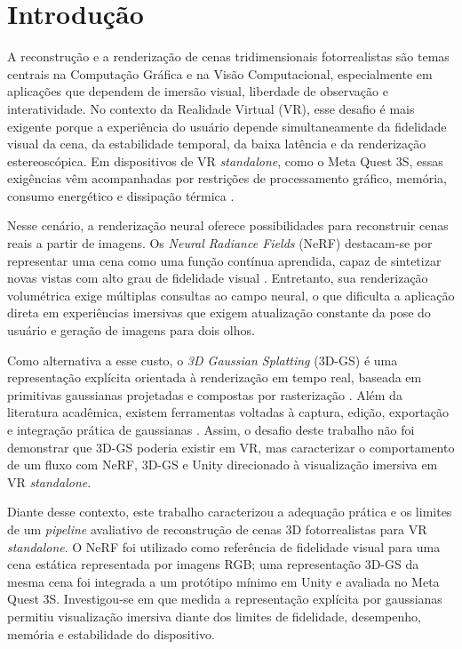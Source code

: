 \chapter{Introdução}

A reconstrução e a renderização de cenas tridimensionais fotorrealistas são temas centrais na Computação Gráfica e na Visão Computacional, especialmente em aplicações que dependem de imersão visual, liberdade de observação e interatividade. No contexto da Realidade Virtual (VR), esse desafio é mais exigente porque a experiência do usuário depende simultaneamente da fidelidade visual da cena, da estabilidade temporal, da baixa latência e da renderização estereoscópica. Em dispositivos de VR \textit{standalone}, como o Meta Quest 3S, essas exigências vêm acompanhadas por restrições de processamento gráfico, memória, consumo energético e dissipação térmica \cite{xu2023,metaquest3s2024,qualcommxr2gen2}.

Nesse cenário, a renderização neural oferece possibilidades para reconstruir cenas reais a partir de imagens. Os \textit{Neural Radiance Fields} (NeRF) destacam-se por representar uma cena como uma função contínua aprendida, capaz de sintetizar novas vistas com alto grau de fidelidade visual \cite{mildenhall2020}. Entretanto, sua renderização volumétrica exige múltiplas consultas ao campo neural, o que dificulta a aplicação direta em experiências imersivas que exigem atualização constante da pose do usuário e geração de imagens para dois olhos.

Como alternativa a esse custo, o \textit{3D Gaussian Splatting} (3D-GS) é uma representação explícita orientada à renderização em tempo real, baseada em primitivas gaussianas projetadas e compostas por rasterização \cite{kerbl2023}. Além da literatura acadêmica, existem ferramentas voltadas à captura, edição, exportação e integração prática de gaussianas \cite{kiri3dgs}. Assim, o desafio deste trabalho não foi demonstrar que 3D-GS poderia existir em VR, mas caracterizar o comportamento de um fluxo com NeRF, 3D-GS e Unity direcionado à visualização imersiva em VR \textit{standalone}.

Diante desse contexto, este trabalho caracterizou a adequação prática e os limites de um \textit{pipeline} avaliativo de reconstrução de cenas 3D fotorrealistas para VR \textit{standalone}. O NeRF foi utilizado como referência de fidelidade visual para uma cena estática representada por imagens RGB; uma representação 3D-GS da mesma cena foi integrada a um protótipo mínimo em Unity e avaliada no Meta Quest 3S. Investigou-se em que medida a representação explícita por gaussianas permitiu visualização imersiva diante dos limites de fidelidade, desempenho, memória e estabilidade do dispositivo.

